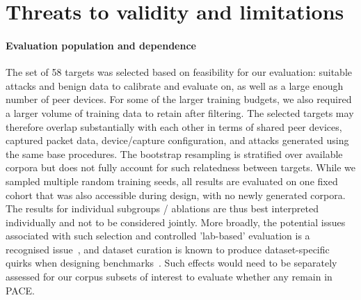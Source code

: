 \section{Threats to validity and limitations} 
\label{sec:limitations} 
\paragraph{Evaluation population and dependence} 
The set of 58 targets was selected based on feasibility for our evaluation: suitable attacks and benign data to calibrate and evaluate on, as well as a large enough number of peer devices. For some of the larger training budgets, we also required a larger volume of training data to retain after filtering. The selected targets may therefore overlap substantially with each other in terms of shared peer devices, captured packet data, device/capture configuration, and attacks generated using the same base procedures. The bootstrap resampling is stratified over available corpora but does not fully account for such relatedness between targets. While we sampled multiple random training seeds, all results are evaluated on one fixed cohort that was also accessible during design, with no newly generated corpora. The results for individual subgroups / ablations are thus best interpreted individually and not to be considered jointly. More broadly, the potential issues associated with such selection and controlled 'lab-based' evaluation is a recognised issue~\cite{arp2024pitfalls}, and dataset curation is known to produce dataset-specific quirks when designing benchmarks~\cite{flood2024smells}. Such effects would need to be separately assessed for our corpus subsets of interest to evaluate whether any remain in PACE.

